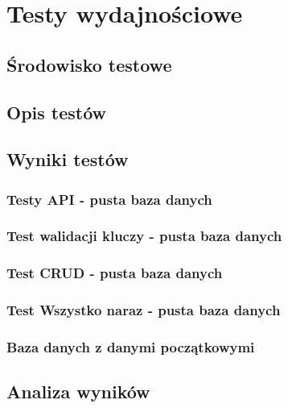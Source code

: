 \chapter{Testy wydajnościowe}
\section{Środowisko testowe}
\section{Opis testów}
\section{Wyniki testów}

\subsection{Testy API - pusta baza danych}

\clearpage

\subsection{Test walidacji kluczy - pusta baza danych}

\clearpage

\subsection{Test CRUD - pusta baza danych}

\clearpage
\subsection{Test Wszystko naraz - pusta baza danych}

\clearpage

\subsection{Baza danych z danymi początkowymi}

\newpage
\section{Analiza wyników}
